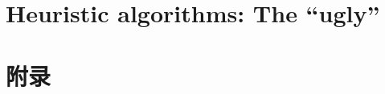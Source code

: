 \documentclass[twoside, openright]{book}
\begin{document}
	\part{Heuristic algorithms: The “ugly”}
		
	\part{附录}
		\appendix
		

	\cleardoublepage	
	
  \cleardoublepage
	{\footnotesize \printindex}	
	
	\blanknonumber\cleardoublepage
	
\end{document}
